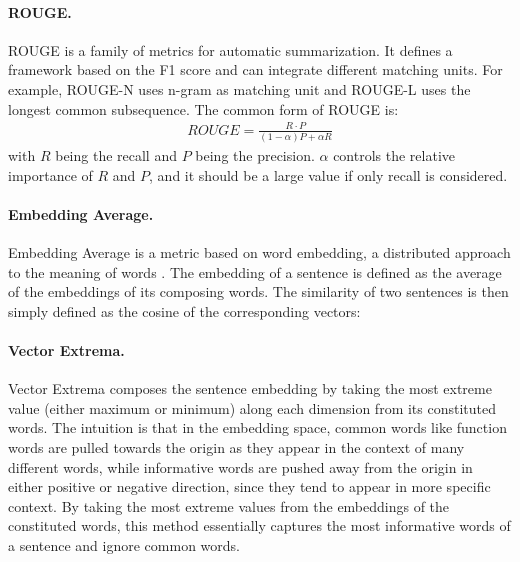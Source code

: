 \documentclass[runningheads]{llncs}
\begin{document}
    \paragraph{ROUGE.}
    ROUGE \cite{ROUGE} is a family of metrics for automatic summarization. It defines a framework based on the F1 score and can integrate different matching units. For example, ROUGE-N uses n-gram as matching unit and ROUGE-L uses the longest common subsequence. The common form of ROUGE is:
    \begin{align}
        \textit{ROUGE} = \frac{
        R \cdot P
        }{(1 - \alpha) P + \alpha R}
    \end{align}
    with $R$ being the recall and $P$ being the precision. $\alpha$ controls the relative importance of $R$ and $P$, and it should be a large value if only recall is considered.

    \paragraph{Embedding Average.}
    Embedding Average is a metric based on word embedding, a distributed approach to the meaning of words \cite{word2vec}. The embedding of a sentence is defined as the average of the embeddings of its composing words. The similarity of two sentences is then simply defined as the cosine of the corresponding vectors:

    \paragraph{Vector Extrema.}
    Vector Extrema \cite{Vector_Extrema} composes the sentence embedding by taking the most extreme value (either maximum or minimum) along each dimension from its constituted words. The intuition is that in the embedding space, common words like function words are pulled towards the origin as they appear in the context of many different words, while informative words are pushed away from the origin in either positive or negative direction, since they tend to appear in more specific context. By taking the most extreme values from the embeddings of the constituted words, this method essentially captures the most informative words of a sentence and ignore common words.
\end{document}

